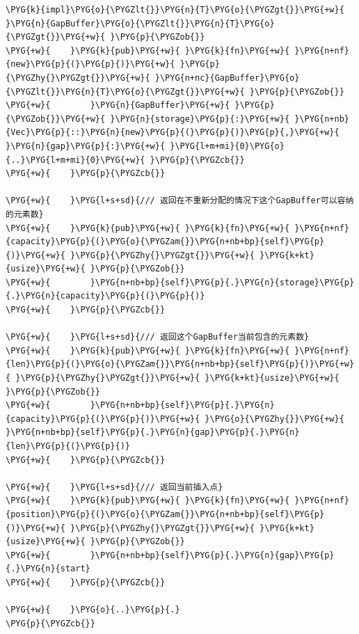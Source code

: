 \begin{Verbatim}[commandchars=\\\{\},breaklines=true,breakanywhere=true,fontsize=\codefont,xleftmargin=17bp]
\PYG{k}{impl}\PYG{o}{\PYGZlt{}}\PYG{n}{T}\PYG{o}{\PYGZgt{}}\PYG{+w}{ }\PYG{n}{GapBuffer}\PYG{o}{\PYGZlt{}}\PYG{n}{T}\PYG{o}{\PYGZgt{}}\PYG{+w}{ }\PYG{p}{\PYGZob{}}
\PYG{+w}{    }\PYG{k}{pub}\PYG{+w}{ }\PYG{k}{fn}\PYG{+w}{ }\PYG{n+nf}{new}\PYG{p}{(}\PYG{p}{)}\PYG{+w}{ }\PYG{p}{\PYGZhy{}\PYGZgt{}}\PYG{+w}{ }\PYG{n+nc}{GapBuffer}\PYG{o}{\PYGZlt{}}\PYG{n}{T}\PYG{o}{\PYGZgt{}}\PYG{+w}{ }\PYG{p}{\PYGZob{}}
\PYG{+w}{        }\PYG{n}{GapBuffer}\PYG{+w}{ }\PYG{p}{\PYGZob{}}\PYG{+w}{ }\PYG{n}{storage}\PYG{p}{:}\PYG{+w}{ }\PYG{n+nb}{Vec}\PYG{p}{::}\PYG{n}{new}\PYG{p}{(}\PYG{p}{)}\PYG{p}{,}\PYG{+w}{ }\PYG{n}{gap}\PYG{p}{:}\PYG{+w}{ }\PYG{l+m+mi}{0}\PYG{o}{..}\PYG{l+m+mi}{0}\PYG{+w}{ }\PYG{p}{\PYGZcb{}}
\PYG{+w}{    }\PYG{p}{\PYGZcb{}}

\PYG{+w}{    }\PYG{l+s+sd}{/// 返回在不重新分配的情况下这个GapBuffer可以容纳的元素数}
\PYG{+w}{    }\PYG{k}{pub}\PYG{+w}{ }\PYG{k}{fn}\PYG{+w}{ }\PYG{n+nf}{capacity}\PYG{p}{(}\PYG{o}{\PYGZam{}}\PYG{n+nb+bp}{self}\PYG{p}{)}\PYG{+w}{ }\PYG{p}{\PYGZhy{}\PYGZgt{}}\PYG{+w}{ }\PYG{k+kt}{usize}\PYG{+w}{ }\PYG{p}{\PYGZob{}}
\PYG{+w}{        }\PYG{n+nb+bp}{self}\PYG{p}{.}\PYG{n}{storage}\PYG{p}{.}\PYG{n}{capacity}\PYG{p}{(}\PYG{p}{)}
\PYG{+w}{    }\PYG{p}{\PYGZcb{}}

\PYG{+w}{    }\PYG{l+s+sd}{/// 返回这个GapBuffer当前包含的元素数}
\PYG{+w}{    }\PYG{k}{pub}\PYG{+w}{ }\PYG{k}{fn}\PYG{+w}{ }\PYG{n+nf}{len}\PYG{p}{(}\PYG{o}{\PYGZam{}}\PYG{n+nb+bp}{self}\PYG{p}{)}\PYG{+w}{ }\PYG{p}{\PYGZhy{}\PYGZgt{}}\PYG{+w}{ }\PYG{k+kt}{usize}\PYG{+w}{ }\PYG{p}{\PYGZob{}}
\PYG{+w}{        }\PYG{n+nb+bp}{self}\PYG{p}{.}\PYG{n}{capacity}\PYG{p}{(}\PYG{p}{)}\PYG{+w}{ }\PYG{o}{\PYGZhy{}}\PYG{+w}{ }\PYG{n+nb+bp}{self}\PYG{p}{.}\PYG{n}{gap}\PYG{p}{.}\PYG{n}{len}\PYG{p}{(}\PYG{p}{)}
\PYG{+w}{    }\PYG{p}{\PYGZcb{}}

\PYG{+w}{    }\PYG{l+s+sd}{/// 返回当前插入点}
\PYG{+w}{    }\PYG{k}{pub}\PYG{+w}{ }\PYG{k}{fn}\PYG{+w}{ }\PYG{n+nf}{position}\PYG{p}{(}\PYG{o}{\PYGZam{}}\PYG{n+nb+bp}{self}\PYG{p}{)}\PYG{+w}{ }\PYG{p}{\PYGZhy{}\PYGZgt{}}\PYG{+w}{ }\PYG{k+kt}{usize}\PYG{+w}{ }\PYG{p}{\PYGZob{}}
\PYG{+w}{        }\PYG{n+nb+bp}{self}\PYG{p}{.}\PYG{n}{gap}\PYG{p}{.}\PYG{n}{start}
\PYG{+w}{    }\PYG{p}{\PYGZcb{}}

\PYG{+w}{    }\PYG{o}{..}\PYG{p}{.}
\PYG{p}{\PYGZcb{}}
\end{Verbatim}

